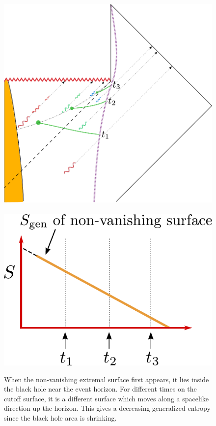 \begin{figure}[t]
\begin{center}
\includegraphics[scale=0.39]{figures/nontrivialsurface.pdf}
 \ \ \ \ \ \ \includegraphics[scale=0.56]{figures/nontrivialcurve.pdf}
\caption{When the non-vanishing extremal surface first appears, it lies inside the black hole near the event horizon. For different times on the cutoff surface, it is a different surface which moves along a spacelike direction up the horizon. This gives a decreasing generalized entropy since the black hole area is shrinking.}
\label{nontrivialsurface}
\end{center}
\end{figure}

